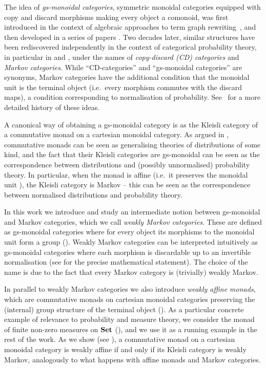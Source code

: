 \documentclass[a4paper,UKenglish,numberwithinsect,cleveref, autoref, thm-restate]{lipics-v2021}
\theoremstyle{plain} %
\theoremstyle{definition} %
\begin{document}
The idea of \emph{gs-monoidal categories}, symmetric monoidal categories equipped with copy and discard morphisms making every object a comonoid,
was first introduced in the context of algebraic approaches to term graph rewriting~\cite{CorradiniGadducci97}, and then
developed in a series of papers \cite{CorradiniGadducci99, CorradiniGadducci99b, CorradiniGadducci02}.
Two decades later, similar structures have been rediscovered independently in the context of categorical probability theory, in particular in \cite{cho_jacobs_2019} 
and \cite{Fritz_2020}, under the names of \emph{copy-discard (CD) categories} and \emph{Markov categories}.
While ``CD-categories'' and ``gs-monoidal categories'' are synonyms, Markov categories have the additional condition that the monoidal unit is the terminal object
(i.e.~every morphism commutes with the discard maps), a condition corresponding to normalisation of probability. See~\cite[Remark~2.2]{fritz2022} 
for a more detailed history of these ideas. 

A canonical way of obtaining a gs-monoidal category is as the Kleisli category of a commutative monad on a cartesian monoidal category. 
As argued in \cite{kock2012distributions}, commutative monads can be seen as generalising theories of distributions of some kind, and the fact that their Kleisli categories are gs-monoidal can be seen as the correspondence between distributions and (possibly unnormalised) probability theory.
In particular, when the monad is affine (i.e.~it preserves the monoidal unit \cite{Kock71,Jacobs1994}), the Kleisli category is Markov -- this can be seen as the correspondence between normalised distributions and probability theory.

In this work we introduce and study an intermediate notion between gs-monoidal and Markov categories, which we call \emph{weakly Markov categories}. 
These are defined as gs-monoidal categories where for every object its morphisms to the monoidal unit form a group (). 
Weakly Markov categories can be interpreted intuitively as gs-monoidal categories where each morphism is discardable up to an invertible normalisation (see  for the precise mathematical statement). The choice of the name is due to the fact that every Markov category is (trivially) weakly Markov.

In parallel to weakly Markov categories we also introduce \emph{weakly affine monads}, which are commutative monads on cartesian monoidal categories preserving the (internal) group structure of the terminal object ().
As a particular concrete example of relevance to probability and measure theory, we consider the monad of finite non-zero measures on $\mathbf{Set}$ (), and we use it as a running example in the rest of the work.
As we show (see ), a commutative monad on a cartesian monoidal category is weakly affine if and only if its Kleisli category is weakly Markov, analogously to what happens with affine monads and Markov categories. 
\end{document}

